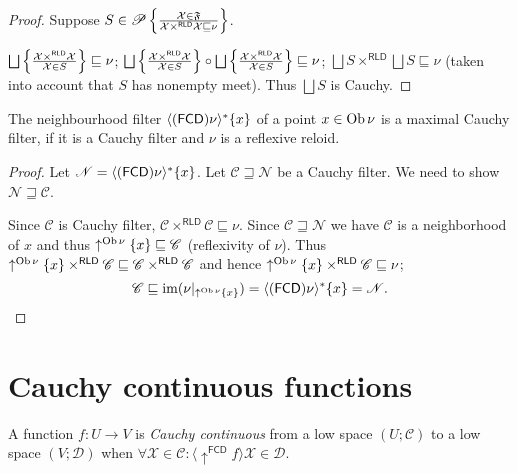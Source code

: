\begin{proof}
  Suppose $S \in \mathscr{P} \left\{ \frac{ \mathcal{X} \in \mathfrak{F} }{ \mathcal{X}
  \times^{\mathsf{RLD}} \mathcal{X} \sqsubseteq \nu }\right\}$.
  
  $\bigsqcup \setcond{ \mathcal{X} \times^{\mathsf{RLD}} \mathcal{X}}
  {\mathcal{X} \in S } \sqsubseteq \nu$;
  $\bigsqcup \setcond{ \mathcal{X} \times^{\mathsf{RLD}} \mathcal{X}}
  {\mathcal{X} \in S } \circ \bigsqcup
  \setcond{ \mathcal{X} \times^{\mathsf{RLD}} \mathcal{X} }
  {\mathcal{X} \in S} \sqsubseteq \nu$; $\bigsqcup S
  \times^{\mathsf{RLD}} \bigsqcup S \sqsubseteq \nu$ (taken into
  account that $S$ has nonempty meet). Thus $\bigsqcup S$ is Cauchy.
\end{proof}

\begin{prop}
  The neighbourhood filter $\langle (\mathsf{FCD}) \nu \rangle^{\ast} \{
  x \}$ of a point $x \in \operatorname{Ob} \nu$ is a maximal Cauchy filter, if it is a
  Cauchy filter and $\nu$ is a reflexive reloid.
\end{prop}

\begin{proof}
  Let $\mathscr{N} = \langle (\mathsf{FCD}) \nu \rangle^{\ast} \{ x
  \}$. Let $\mathscr{C \sqsupseteq N}$ be a Cauchy filter. We need to show
  $\mathscr{N \sqsupseteq C}$.
  
  Since $\mathscr{C}$ is Cauchy filter, $\mathscr{C}
  \times^{\mathsf{RLD}} \mathscr{C} \sqsubseteq \nu$. Since $\mathscr{C
  \sqsupseteq N}$ we have $\mathscr{C}$ is a neighborhood of $x$ and thus
  $\uparrow^{\operatorname{Ob} \nu} \{ x \} \sqsubseteq \mathscr{C}$ (reflexivity of
  $\nu$). Thus $\uparrow^{\operatorname{Ob} \nu} \{ x \} \times^{\mathsf{RLD}}
  \mathscr{C} \sqsubseteq \mathscr{C} \times^{\mathsf{RLD}}
  \mathscr{C}$ and hence $\uparrow^{\operatorname{Ob} \nu} \{ x \}
  \times^{\mathsf{RLD}} \mathscr{C} \sqsubseteq \nu$;
  \[ \mathscr{C} \sqsubseteq \operatorname{im} (\nu |_{\uparrow^{\operatorname{Ob} \nu} \{ x
     \}}) = \langle (\mathsf{FCD}) \nu \rangle^{\ast} \{ x \} =
     \mathscr{N} . \]
\end{proof}

\section{Cauchy continuous functions}

\begin{defn}
  A function $f : U \rightarrow V$ is \emph{Cauchy continuous} from a low
  space $\left( U ; \mathscr{C} \right)$ to a low space
  $\left( V ; \mathscr{D} \right)$ when $\forall \mathcal{X} \in \mathscr{C} :
  \langle \uparrow^{\mathsf{FCD}} f \rangle \mathcal{X} \in
  \mathscr{D}$.
\end{defn}

